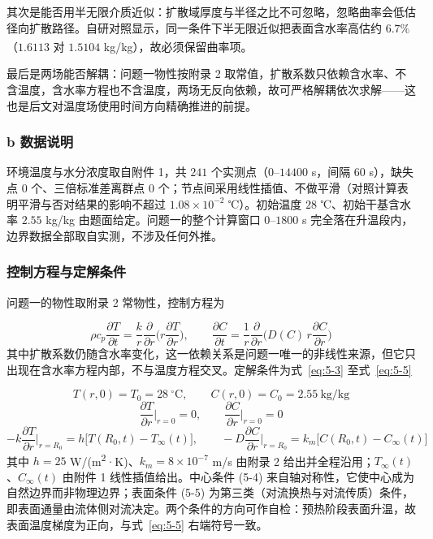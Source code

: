 其次是能否用半无限介质近似：扩散域厚度与半径之比不可忽略，忽略曲率会低估径向扩散路径。自研对照显示，同一条件下半无限近似把表面含水率高估约 $6.7\%$（$1.6113$ 对 $1.5104$ kg/kg），故必须保留曲率项\textsuperscript{\cite{ref1}}。

最后是两场能否解耦：问题一物性按附录 2 取常值，扩散系数只依赖含水率、不含温度，含水率方程也不含温度，两场无反向依赖，故可严格解耦依次求解——这也是后文对温度场使用时间方向精确推进的前提。

\subsubsection{b 数据说明}
环境温度与水分浓度取自附件 1，共 $241$ 个实测点（$0$–$14400$ s，间隔 $60$ s），缺失点 $0$ 个、三倍标准差离群点 $0$ 个；节点间采用线性插值、不做平滑（对照计算表明平滑与否对结果的影响不超过 $1.08\times10^{-2}$ ℃）。初始温度 $28$ ℃、初始干基含水率 $2.55$ kg/kg 由题面给定。问题一的整个计算窗口 $0$–$1800$ s 完全落在升温段内，边界数据全部取自实测，不涉及任何外推。

\subsubsection{控制方程与定解条件}
问题一的物性取附录 2 常物性，控制方程为

\begin{equation}
  \rho c_p\frac{\partial T}{\partial t}=\frac{k}{r}\frac{\partial}{\partial r}\Big(r\frac{\partial T}{\partial r}\Big),\qquad \frac{\partial C}{\partial t}=\frac{1}{r}\frac{\partial}{\partial r}\Big(D(C)\,r\frac{\partial C}{\partial r}\Big)
  \label{eq:5-2}
\end{equation}
其中扩散系数仍随含水率变化，这一依赖关系是问题一唯一的非线性来源，但它只出现在含水率方程内部，不与温度方程交叉。定解条件为式~\eqref{eq:5-3} 至式~\eqref{eq:5-5}

\begin{equation}
  T(r,0)=T_0=28\ \mathrm{^\circ C},\qquad C(r,0)=C_0=2.55\ \mathrm{kg/kg}
  \label{eq:5-3}
\end{equation}
\begin{equation}
  \frac{\partial T}{\partial r}\Big|_{r=0}=0,\qquad \frac{\partial C}{\partial r}\Big|_{r=0}=0
  \label{eq:5-4}
\end{equation}
\begin{equation}
  -k\frac{\partial T}{\partial r}\Big|_{r=R_0}=h\big[T(R_0,t)-T_\infty(t)\big],\qquad -D\frac{\partial C}{\partial r}\Big|_{r=R_0}=k_m\big[C(R_0,t)-C_\infty(t)\big]
  \label{eq:5-5}
\end{equation}
其中 $h=25$ W/(m\textsuperscript{2}·K)、$k_m=8\times10^{-7}$ m/s 由附录 2 给出并全程沿用；$T_\infty(t)$、$C_\infty(t)$ 由附件 1 线性插值给出。中心条件 (5-4) 来自轴对称性，它使中心成为自然边界而非物理边界；表面条件 (5-5) 为第三类（对流换热与对流传质）条件，即表面通量由流体侧对流决定。两个条件的方向可作自检：预热阶段表面升温，故表面温度梯度为正向，与式~\eqref{eq:5-5} 右端符号一致。

